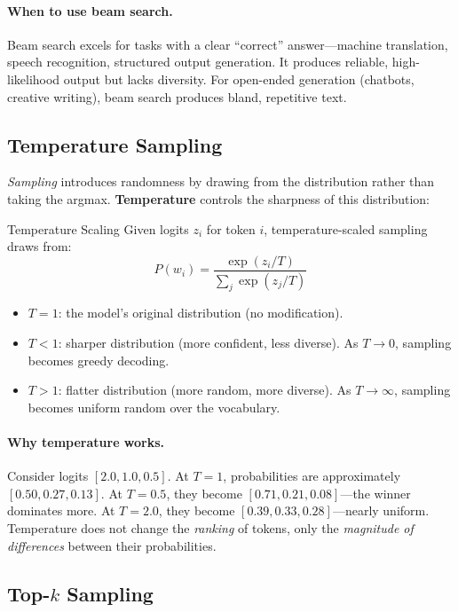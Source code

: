 \paragraph{When to use beam search.}
Beam search excels for tasks with a clear ``correct'' answer---machine
translation, speech recognition, structured output generation.  It produces
reliable, high-likelihood output but lacks diversity.  For open-ended generation
(chatbots, creative writing), beam search produces bland, repetitive text.

\subsection{Temperature Sampling}

\emph{Sampling} introduces randomness by drawing from the distribution rather
than taking the argmax.  \textbf{Temperature} controls the sharpness of this
distribution:

\begin{mathresult}{Temperature Scaling}
Given logits $z_i$ for token $i$, temperature-scaled sampling draws from:
\[
    P(w_i) = \frac{\exp(z_i / T)}{\sum_j \exp(z_j / T)}
\]
\begin{itemize}
    \item $T = 1$: the model's original distribution (no modification).
    \item $T < 1$: sharper distribution (more confident, less diverse).
          As $T \to 0$, sampling becomes greedy decoding.
    \item $T > 1$: flatter distribution (more random, more diverse).
          As $T \to \infty$, sampling becomes uniform random over the vocabulary.
\end{itemize}
\end{mathresult}

\paragraph{Why temperature works.}
Consider logits $[2.0, 1.0, 0.5]$.  At $T{=}1$, probabilities are approximately
$[0.50, 0.27, 0.13]$.  At $T{=}0.5$, they become $[0.71, 0.21, 0.08]$---the
winner dominates more.  At $T{=}2.0$, they become $[0.39, 0.33, 0.28]$---nearly
uniform.  Temperature does not change the \emph{ranking} of tokens, only the
\emph{magnitude of differences} between their probabilities.

\subsection{Top-$k$ Sampling}

